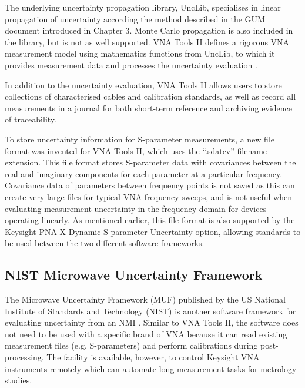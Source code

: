 \documentclass[../thesis/thesis.tex]{subfiles}
\begin{document}
The underlying uncertainty propagation library, UncLib, specialises in linear propagation of uncertainty according the method described in the GUM document introduced in Chapter 3. Monte Carlo propagation is also included in the library, but is not as well supported. VNA Tools II defines a rigorous VNA measurement model using mathematics functions from UncLib, to which it provides measurement data and processes the uncertainty evaluation \cite{Wollensack_2012}.

In addition to the uncertainty evaluation, VNA Tools II allows users to store collections of characterised cables and calibration standards, as well as record all measurements in a journal for both short-term reference and archiving evidence of traceability.

To store uncertainty information for S-parameter measurements, a new file format was invented for VNA Tools II, which uses the ``.sdatcv'' filename extension. This file format stores S-parameter data with covariances between the real and imaginary components for each parameter at a particular frequency. Covariance data of parameters between frequency points is not saved as this can create very large files for typical VNA frequency sweeps, and is not useful when evaluating measurement uncertainty in the frequency domain for devices operating linearly. As mentioned earlier, this file format is also supported by the Keysight PNA-X Dynamic S-parameter Uncertainty option, allowing standards to be used between the two different software frameworks.

\subsection{NIST Microwave Uncertainty Framework}

The Microwave Uncertainty Framework (MUF) published by the US National Institute of Standards and Technology (NIST) is another software framework for evaluating uncertainty from an NMI \cite{MUFWebsite, Ginley_2016, Ginley_2017}. Similar to VNA Tools II, the software does not need to be used with a specific brand of VNA because it can read existing measurement files (e.g. S-parameters) and perform calibrations during post-processing. The facility is available, however, to control Keysight VNA instruments remotely which can automate long measurement tasks for metrology studies.
\end{document}
